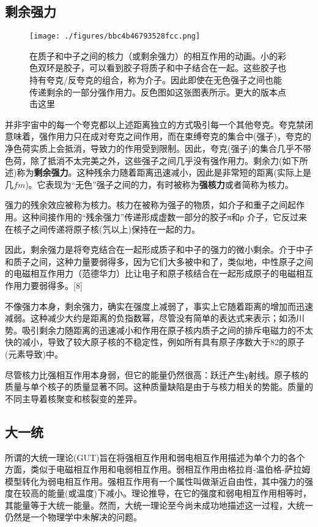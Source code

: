 \subsection{剩余强力}
\begin{figure}[ht]
\centering
\texttt{[image: ./figures/bbc4b46793528fcc.png]}
\caption{在质子和中子之间的核力（或剩余强力）的相互作用的动画。小的彩色双环是胶子，可以看到胶子将质子和中子结合在一起。这些胶子也持有夸克/反夸克的组合，称为介子。因此即使在无色强子之间也能传递剩余的一部分强作用力。反色图如这张图表所示。更大的版本点击这里} \label{fig_QXHZY_2}
\end{figure}
并非宇宙中的每一个夸克都以上述距离独立的方式吸引每一个其他夸克。夸克禁闭意味着，强作用力只在成对夸克之间作用，而在束缚夸克的集合中(强子)，夸克的净色荷实质上会抵消，导致力的作用受到限制。因此，夸克(强子)的集合几乎不带色荷，除了抵消不太完美之外，这些强子之间几乎没有强作用力。剩余力(如下所述)称为\textbf{剩余强力}。这种残余力随着距离迅速减小，因此是非常短的距离(实际上是几$fm$)。它表现为“无色”强子之间的力，有时被称为\textbf{强核力}或者简称为核力。

强力的残余效应被称为核力。核力在被称为强子的物质，如介子和重子之间起作用。这种间接作用的“残余强力”传递形成虚数一部分的胶子π和ρ 介子，它反过来在核子之间传递将原子核(氕以上)保持在一起的力。

因此，剩余强力是将夸克结合在一起形成质子和中子的强力的微小剩余。介于中子和质子之间，这种力量要弱得多，因为它们大多被中和了，类似地，中性原子之间的电磁相互作用力（范德华力）比让电子和原子核结合在一起形成原子的电磁相互作用力要弱得多。[8]

不像强力本身，剩余强力，确实在强度上减弱了，事实上它随着距离的增加而迅速减弱。这种减少大约是距离的负指数幂，尽管没有简单的表达式来表示；如汤川势。吸引剩余力随距离的迅速减小和作用在原子核内质子之间的排斥电磁力的不太快的减小，导致了较大原子核的不稳定性，例如所有具有原子序数大于82的原子(元素导致)中。

尽管核力比强相互作用本身弱，但它的能量仍然很高：跃迁产生γ射线。原子核的质量与单个核子的质量显著不同。这种质量缺陷是由于与核力相关的势能。质量的不同主导着核聚变和核裂变的差异。

\subsection{大一统}
所谓的大统一理论(GUT)旨在将强相互作用和弱电相互作用描述为单个力的各个方面，类似于电磁相互作用和电弱相互作用。弱相互作用由格拉肖-温伯格-萨拉姆模型转化为弱电相互作用。强相互作用有一个属性叫做渐近自由性，其中强力的强度在较高的能量(或温度)下减小。理论推导，在它的强度和弱电相互作用相等时，其能量等于大统一能量。然而，大统一理论至今尚未成功地描述这一过程，大统一仍然是一个物理学中未解决的问题。

